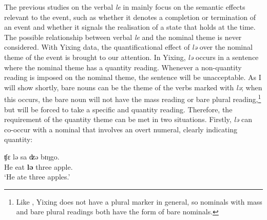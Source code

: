 \documentclass[output=paper]{langsci/langscibook}
\begin{document}
\begin{exe}
\ex {} \begin{xlist}


\end{xlist}
\end{exe}

The previous studies on the verbal \emph{le} in  mainly focus on the
semantic effects relevant to the event, such as whether it denotes a completion
or termination of an event and whether it signals the realisation of a state
that holds at the  time. The possible relationship between verbal
\emph{le} and the nominal theme is never considered. With Yixing data, the
quantificational effect of \emph{lə} over the nominal theme of the event is
brought to our attention. In Yixing, \emph{lə} occurs in a sentence where the
nominal theme has a quantity reading. Whenever a non-quantity reading is
imposed on the nominal theme, the sentence will be unacceptable. As I will show
shortly, bare nouns can be the theme of the verbs marked with \emph{lə}; when
this occurs, the bare noun will not have the mass reading or bare plural
reading,\footnote{Like , Yixing does not have a plural marker in
general, so nominals with mass and bare plural readings both have the form of
bare nominals.} but will be forced to take a specific and quantity reading.
Therefore, the requirement of the quantity theme can be met in two situations.
Firstly, \emph{lə} can co-occur with a nominal that involves an overt numeral,
clearly indicating quantity:

\begin{exe}
    \ex {}
\sn {} {ʧε} {lə} sa {ʣə} bɪŋgo. \\
    He eat \textbf{{lə}} three \Clf{} apple. \\
    \glt \enquote*{He ate three apples.}
\end{exe}
\end{document}
